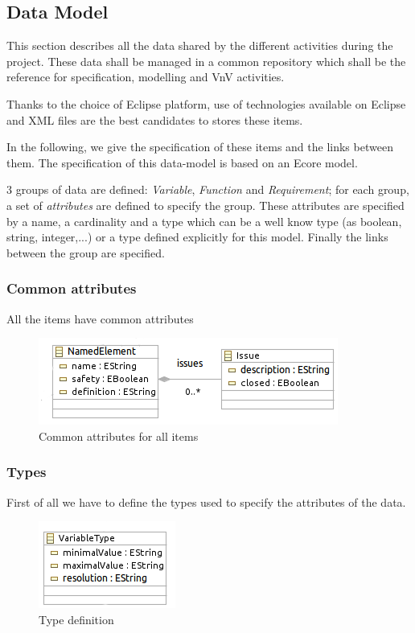 \subsection{Data Model}
\label{sec:datamodel}

This section describes all the data shared by the different activities during the project.
These data shall be managed in a common repository which shall be the reference for specification, modelling and VnV activities.

Thanks to the choice of Eclipse platform, use of technologies available on Eclipse and XML files are the best candidates to stores these items.

In the following, we give the specification of these items and the links between them. The specification of this data-model is based on an Ecore model.

3 groups of data are defined: \emph{Variable}, \emph{Function} and \emph{Requirement}; for each group, a set of \emph{attributes} are defined to specify the group. These attributes are specified by a name, a cardinality and a type which can be a well  know type  (as boolean, string, integer,...) or a type defined explicitly for this model.
Finally the links between the group are specified.


\subsubsection{Common attributes}

All the items have common attributes


\begin{figure}[ht]
  \centering
  \includegraphics{DataModel/Common1.png}
  \caption{Common attributes for all items}
  \label{fig:Common}
\end{figure}

\subsubsection{Types}

First of all we have to define the types used to specify the attributes of the data.

\begin{figure}[ht]
  \centering
  \includegraphics{DataModel/Type1.png}
  \caption{Type definition}
  \label{fig:Type}
\end{figure}

